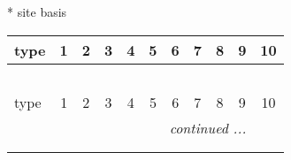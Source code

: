 \documentclass[fleqn,9pt,landscape]{jsarticle}
\begin{document}
* site basis
\begin{center}
\renewcommand{\arraystretch}{1.3}
\begin{longtable}{lcccccccccc}
 \hline \hline
type & 1 & 2 & 3 & 4 & 5 & 6 & 7 & 8 & 9 & 10 \\ \hline \endfirsthead

\multicolumn{10}{l}{\tablename\ \thetable{}} \\
 \hline \hline
type & 1 & 2 & 3 & 4 & 5 & 6 & 7 & 8 & 9 & 10 \\ \hline \endhead

 \hline \hline
\multicolumn{10}{r}{\footnotesize\it continued ...} \\ \endfoot

 \hline \hline
\multicolumn{10}{r}{} \\ \endlastfoot


\end{longtable}
\end{center}
\end{document}
